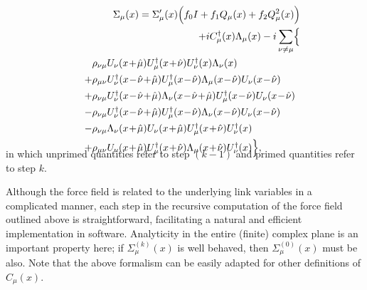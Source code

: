 \begin{eqnarray}
&&\Sigma_\mu(x) = \Sigma_\mu^\prime(x)
  \Bigl(f_0I+f_1Q_\mu(x)+f_2Q_\mu^2(x)\Bigr)\nonumber\\
   &&+iC^\dagger_\mu(x)\Lambda_\mu(x)  -i
 \displaystyle\sum_{\nu\neq\mu}\Bigl\{
\nonumber\\ &&
 \begin{array}[t]{l}
 \phantom{+} \rho_{\nu\mu}U_\nu(x\!+\!\hat{\mu}) 
       U^\dagger_\mu(x\!+\!\hat{\nu})U^\dagger_\nu(x)\Lambda_\nu(x) \\[1ex]
 +\rho_{\mu\nu}U^\dagger_\nu(x\!-\!\hat{\nu}\!+\!\hat{\mu})
   U^\dagger_\mu(x\!-\!\hat{\nu})\Lambda_\mu(x\!-\!\hat{\nu})
   U_\nu(x\!-\!\hat{\nu})    \\[1ex]
+\rho_{\nu\mu}U^\dagger_\nu(x\!-\!\hat{\nu}\!+\!\hat{\mu})
  \Lambda_\nu(x\!-\!\hat{\nu}\!+\!\hat{\mu})
  U^\dagger_\mu(x\!-\!\hat{\nu}) U_\nu(x\!-\!\hat{\nu}) \\[1ex]
-\rho_{\nu\mu} U^\dagger_\nu(x\!-\!\hat{\nu}\!+\!\hat{\mu})
 U^\dagger_\mu(x\!-\!\hat{\nu}) \Lambda_\nu(x\!-\!\hat{\nu})
  U_\nu(x\!-\!\hat{\nu}) \\[1ex]
-\rho_{\nu\mu}  \Lambda_\nu(x\!+\!\hat{\mu})U_\nu(x\!+\!\hat{\mu})
   U^\dagger_\mu(x\!+\!\hat{\nu})
   U^\dagger_\nu(x) \\[1ex]
+\rho_{\mu\nu}U_\nu(x\!+\!\hat{\mu})U^\dagger_\mu(x\!+\!\hat{\nu})
 \Lambda_\mu(x\!+\!\hat{\nu})
 U^\dagger_\nu(x) 
 \Bigr\},\end{array} \nonumber\\[-6mm]
\label{eq:sigma}
\end{eqnarray}
in which unprimed quantities refer to step $(k-1)$ and primed quantities
refer to step $k$.

Although the force field is related to the underlying link variables in
a complicated manner, each step in the recursive computation
of the force field outlined above is straightforward, facilitating a
natural and efficient implementation in software.  Analyticity in the
entire (finite) complex plane is an important property here; if 
$\Sigma^{(k)}_\mu(x)$ is well behaved, then $\Sigma^{(0)}_\mu(x)$ must
be also.  Note that the above formalism can be easily adapted for other
definitions of $C_\mu(x)$.

